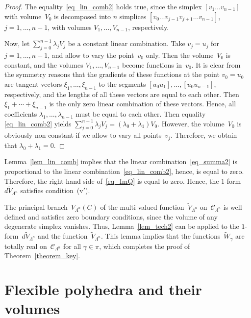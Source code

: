 \documentclass[reqno,tbtags,12pt]{amsart}
\numberwithin{equation}{section}
\newcommand{\CC}{\mathcal{C}}
\newcommand{\tV}{\widetilde{V}}
\newcommand{\tW}{\widetilde{W}}
\theoremstyle{definition}
\begin{document}
\begin{proof}
The equality~\eqref{eq_lin_comb2} holds true, since the simplex $[v_1\ldots v_{n-1}]$ with volume~$V_0$ is decomposed into $n$ simplices $[v_0\ldots v_{j-1}v_{j+1}\ldots v_{n-1}]$, $j=1,\ldots,n-1$, with volumes $V_1,\ldots,V_{n-1}$, respectively.

Now, let $\sum_{j=0}^{n-1}\lambda_jV_j$ be a constant linear combination. Take $v_j=u_j$ for  $j=1,\ldots,n-1$, and allow to vary the point~$v_0$ only. Then the volume~$V_0$ is constant, and the volumes $V_1,\ldots, V_{n-1}$ become functions in~$v_0$. It is clear from the symmetry reasons that the gradients of these functions at the point $v_0=u_0$ are tangent vectors  $\xi_1,\ldots,\xi_{n-1}$ to the segments $[u_0u_1],\ldots,[u_0u_{n-1}]$, respectively, and the lengths of all these vectors are equal to each other. Then   $\xi_1+\cdots+\xi_{n-1}$ is the only zero linear combination of these vectors. Hence, all coefficients $\lambda_1,\ldots,\lambda_{n-1}$ must be equal to each other. Then equality~ \eqref{eq_lin_comb2} yields \mbox{$\sum_{j=0}^{n-1}\lambda_jV_j=(\lambda_0+\lambda_1)V_0$.} However, the volume~$V_0$ is obviously non-constant if we allow to vary all points~$v_j$. Therefore, we obtain that $\lambda_0+\lambda_1=0$.
\end{proof}

Lemma~\ref{lem_lin_comb} implies that the linear combination~\eqref{eq_summa2} is proportional to the linear combination~\eqref{eq_lin_comb2}, hence, is equal to zero. Therefore, the right-hand side of~\eqref{eq_ImQ} is equal to zero. Hence, the $1$-form~$d\tV_{\Lambda^n}$ satisfies condition~(v${}'$).

The principal branch~$V_{\Lambda^n}(C)$ of the multi-valued function~$\tV_{\Lambda^n}$ on~$\CC_{\Lambda^n}$ is well defined and satisfies zero boundary conditions, since the volume of any degenerate simplex vanishes. Thus, Lemma~\ref{lem_tech2} can be applied to the $1$-form~$d\tV_{\Lambda^n}$ and the function~$\tV_{\Lambda^n}$. This lemma implies that the functions~$\tW_{\gamma}$ are totally real on~$\CC_{\Lambda^n}$ for all $\gamma\in\pi$, which completes the proof of Theorem~\ref{theorem_key}.








\section{Flexible polyhedra and their volumes}\label{section_def_res}
\end{document}
